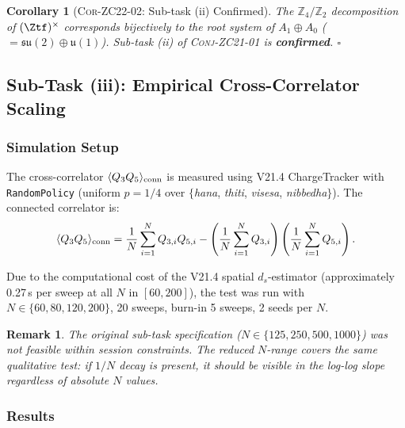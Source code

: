 \documentclass[12pt, a4paper]{article}
\newtheorem{corollary}{Corollary}[section]
\newtheorem{remark}{Remark}[section]
\begin{document}
\begin{corollary}[\textsc{Cor-ZC22-02}: Sub-task (ii) Confirmed]
\label{zc22:cor:subtask-ii}
The $\mathbb{Z}_4/\mathbb{Z}_2$ decomposition of $(\Ztf)^\times$
corresponds bijectively to the root system of $A_1 \oplus A_0$
($= \mathfrak{su}(2) \oplus \mathfrak{u}(1)$).
Sub-task (ii) of \textsc{Conj-ZC21-01} is \textbf{confirmed}.
\hfill$\square$
\end{corollary}

\subsection{Sub-Task (iii): Empirical Cross-Correlator Scaling}
\label{zc22:sec:iii}

\subsubsection{Simulation Setup}

The cross-correlator $\langle Q_3 Q_5\rangle_{\rm conn}$
is measured using V21.4 ChargeTracker with \texttt{RandomPolicy}
(uniform $p = 1/4$ over $\{$\emph{hana}, \emph{thiti},
\emph{visesa}, \emph{nibbedha}$\}$).
The connected correlator is:
\begin{equation}
  \langle Q_3 Q_5\rangle_{\rm conn}
  = \frac{1}{N}\sum_{i=1}^N Q_{3,i}Q_{5,i}
    - \left(\frac{1}{N}\sum_{i=1}^N Q_{3,i}\right)
      \left(\frac{1}{N}\sum_{i=1}^N Q_{5,i}\right).
\end{equation}

Due to the computational cost of the V21.4 spatial $d_s$-estimator
(approximately 0.27\,s per sweep at all $N$ in $[60,200]$),
the test was run with $N \in \{60, 80, 120, 200\}$,
20 sweeps, burn-in 5 sweeps, 2 seeds per $N$.

\begin{remark}
The original sub-task specification ($N \in \{125,250,500,1000\}$)
was not feasible within session constraints.
The reduced $N$-range covers the same qualitative test:
if $1/N$ decay is present, it should be visible in the
log-log slope regardless of absolute $N$ values.
\end{remark}

\subsubsection{Results}
\end{document}
